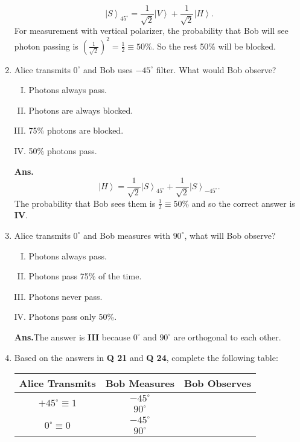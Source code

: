\documentclass[12pt]{article}
\newcommand\half{\frac{1}{2}}
\newcommand\rr{\right \rangle}
\newcommand\ls{\left |}
\newcommand\tbf[1]{\textbf{#1}}
\newcommand\tans{\tbf{Ans.}}
\begin{document}
\begin{enumerate}[1.]
$$\ls S \rr _{45^\circ} = \frac{1}{\sqrt{2}} \ls V \rr + \frac{1}{\sqrt{2}} \ls H \rr.$$
For measurement with vertical polarizer, the probability that Bob will see photon passing is $\left(\frac{1}{\sqrt{2}}\right)^2=\half \equiv 50\%$. So the rest 50\% will be blocked.
\item Alice transmits $0^\circ$ and Bob uses $-45^\circ$ filter. What would Bob observe?
\begin{enumerate}[I.]
\item Photons always pass.
\item Photons are always blocked.
\item 75\% photons are blocked.
\item 50\% photons pass. \newline
\end{enumerate}
\tans $$\ls H \rr =\frac{1}{\sqrt{2}}\ls S \rr _{45^\circ}+\frac{1}{\sqrt{2}}\ls S \rr _{-45^\circ}.$$
The probability that Bob sees them is $\half \equiv 50\%$ and so the correct answer is \tbf{IV}.
\item Alice transmits $0^\circ$ and Bob measures with $90^\circ$, what will Bob observe?
\begin{enumerate}[I.]
\item Photons always pass.
\item Photons pass 75\% of the time.
\item Photons never pass.
\item Photons pass only 50\%. \newline
\end{enumerate}
\tans The answer is \tbf{III} because $0^\circ$ and $90^\circ$ are orthogonal to each other.
\item Based on the answers in \tbf{Q 21} and \tbf{Q 24}, complete the following table:
\begin{center}
\begin{tabular}{|c|c|c|}
\hline
Alice Transmits & Bob Measures & Bob Observes \\
\hline
\multirow{2}{*}{$+45^\circ \equiv 1$} & $-45^\circ$ & \phantom{0} \\
					   \cline{2-3}
					   & $90^\circ$ & \phantom{$\half$} \\
\hline
\multirow{2}{*}{$0^\circ \equiv 0$} & $-45^\circ$ & \phantom{$\half$} \\
						\cline{2-3}
					& $90^\circ$ & \phantom{0} \\
\hline
\end{tabular}
\end{center}

\end{enumerate}
\end{document}
